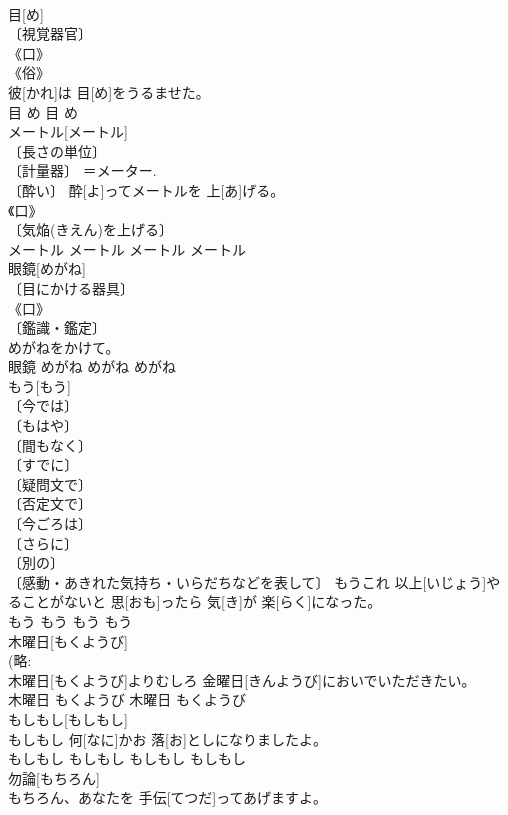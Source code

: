\documentclass[8pt]{extreport}
\begin{document}
\begin{CJK}{UTF8}{min}
\\	目[め]	
\\	〔視覚器官〕 
\\	《口》 
\\	《俗》 
\\	彼[かれ]は 目[め]をうるませた。	
\\	目	め	目	め	
\\	メートル[メートル]	
\\	〔長さの単位〕 
\\	〔計量器〕 ＝メーター. 
\\	〔酔い〕	酔[よ]ってメートルを 上[あ]げる。	
\\	《口》 
\\	〔気焔(きえん)を上げる〕 
\\	メートル	メートル	メートル	メートル	
\\	眼鏡[めがね]	
\\	〔目にかける器具〕 
\\	《口》 
\\	〔鑑識・鑑定〕 
\\	めがねをかけて。	
\\	眼鏡	めがね	めがね	めがね	
\\	もう[もう]	
\\	〔今では〕 
\\	〔もはや〕 
\\	〔間もなく〕 
\\	〔すでに〕 
\\	〔疑問文で〕 
\\	〔否定文で〕 
\\	〔今ごろは〕 
\\	〔さらに〕 
\\	〔別の〕 
\\	〔感動・あきれた気持ち・いらだちなどを表して〕	もうこれ 以上[いじょう]やることがないと 思[おも]ったら 気[き]が 楽[らく]になった。	
\\	もう	もう	もう	もう	
\\	木曜日[もくようび]	
\\	(略: 
\\	木曜日[もくようび]よりむしろ 金曜日[きんようび]においでいただきたい。	
\\	木曜日	もくようび	木曜日	もくようび	
\\	もしもし[もしもし]	
\\	もしもし 何[なに]かお 落[お]としになりましたよ。	
\\	もしもし	もしもし	もしもし	もしもし	
\\	勿論[もちろん]	
\\	もちろん、あなたを 手伝[てつだ]ってあげますよ。	

\end{CJK}
\end{document}

